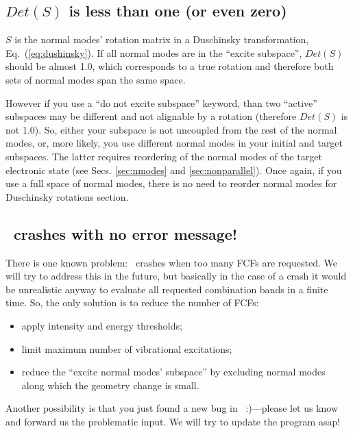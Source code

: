 \documentclass[11pt]{article}
\begin{document}
\subsection{$Det(S)$ is less than one (or even zero)}
\label{sec:detS}

$S$ is the normal modes' rotation matrix in a Duschinsky transformation, Eq.~(\ref{eq:dushinsky}).
If all normal modes are in the ``excite subspace'', $Det(S)$ should be almost 1.0, 
which corresponds to a true rotation and therefore both sets of normal modes span the same space.

However if you use a ``do not excite subspace'' keyword, than two ``active''
subspaces may be different and not alignable by a rotation (therefore $Det(S)$ is not 1.0).
So, either your subspace is not uncoupled from the rest of the normal modes, or, 
more likely, you use different normal modes in your initial and target subspaces.
The latter requires reordering of the normal modes of the target electronic state
(see Secs. \ref{sec:nmodes} and \ref{sec:nonparallel}).
Once again, if you use a full space of normal modes, there is no need to reorder normal modes for Duschinsky rotations section.

\subsection{\ezFCF\ crashes with no error message!}
\label{sec:crash}

There is one known problem: \ezFCF\ crashes when too many FCFs are requested.
We will try to address this in the future, 
but basically in the case of a crash it would be unrealistic anyway to evaluate all requested combination bands 
in a finite time.
So, the only solution is to reduce the number of FCFs:
\begin{itemize}
\item apply intensity and energy thresholds;  
\item limit maximum number of vibrational excitations; 
\item reduce the ``excite normal modes' subspace'' by excluding normal modes along which the geometry change is small.
\end{itemize}

Another possibility is that you just found a new bug in \ezFCF\ :)---please let us know and forward us
the problematic input. We will try to update the program asap!
\end{document}
